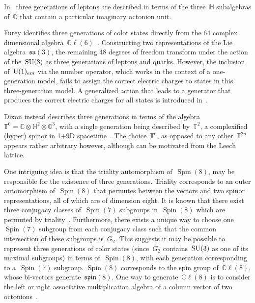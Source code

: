 \documentclass[reqno,11pt]{amsart}
\numberwithin{equation}{section}
\newcommand{\1}{\mbox{\rm 1 \hspace{-1.05 em} 1}}
\newcommand{\U}{{\rm{U}}}
\newcommand{\SU}{{\rm{SU}}}
\DeclareMathOperator{\Spin}{Spin}
\newcommand{\bb}[1]{\mathbb{#1}}
\begin{document}
In~\cite{manogue1999dimensional} three generations of leptons are described in terms of the three~$\bb{H}$ subalgebras of~$\bb{O}$ that contain a particular imaginary octonion unit. 

Furey identifies three generations of color states directly from the 64 complex dimensional algebra~$\bb{C}\ell(6)$~\cite{furey2014generations}. Constructing two representations of the Lie algebra~$\mathfrak{su}(3)$, the remaining 48 degrees of freedom transform under the action of the~$\SU(3)$ as three generations of leptons and quarks. However, the inclusion of~$\U(1)_{em}$ via the number operator, which works in the context of a one-generation model, fails to assign the correct electric charges to states in this three-generation model. A generalized action that leads to a generator that produces the correct electric charges for all states is introduced in~\cite{furey2018three}.

Dixon instead describes three generations in terms of the algebra~$\bb{T}^6=\bb{C}\otimes\bb{H}^2\otimes\bb{O}^3$, with a single generation being described by~$\bb{T}^2$, a complexified (hyper) spinor in 1+9D spacetime~\cite{dixon2004division}. The choice~$\bb{T}^6$, as opposed to any other~$\bb{T}^{2n}$ appears rather arbitrary however, although can be motivated from the Leech lattice.

One intriguing idea is that the triality automorphism of~$\Spin(8)$, may be responsible for the existence of three generations. Triality corresponds to an outer automorphism of~$\Spin(8)$ that permutes between the vectors and two spinor representations, all of which are of dimension eight. It is known that there exist three conjugacy classes of~$\Spin(7)$ subgroups in~$\Spin(8)$ which are permuted by triality~\cite{varadarajan2001spin}. Furthermore, there exists a unique way to choose one~$\Spin(7)$ subgroup from each conjugacy class such that the common intersection of these subgroups is~$G_2$. This suggests it may be possible to represent three generations of color states (since~$G_2$ contains~$\SU(3)$ as one of its maximal subgroups) in terms of~$\Spin(8)$, with each generation corresponding to a~$\Spin(7)$ subgroup. $\Spin(8)$ corresponds to the spin group of~$\bb{C}\ell(8)$, whose bi-vectors generate~$\mathfrak{spin}(8)$. One way to generate~$\bb{C}\ell(8)$ is to consider the left or right associative multiplication algebra of a column vector of two octonions~\cite{schray1994octonions}. 
\end{document}

